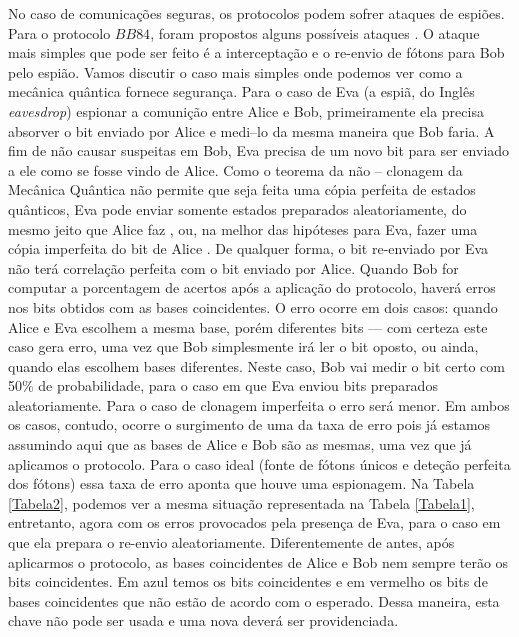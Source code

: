 \documentclass[pra, twocolumn]{revtex4}
\begin{document}
	No caso de comunica\c c\~oes seguras, os protocolos podem sofrer ataques de espi\~oes. Para o protocolo $BB84$, foram propostos alguns poss\'iveis ataques \cite{attacks}. O ataque mais simples que pode ser feito
	\'e a intercepta\c c\~ao e o re-envio de f\'otons para Bob pelo espi\~ao. Vamos discutir o caso mais simples onde podemos ver como a mec\^anica qu\^antica fornece seguran\c ca. Para o caso de Eva (a espi\~a, do Ingl\^es \textit{eavesdrop}) espionar a comuni\c c\~ao entre Alice e Bob, primeiramente ela precisa absorver o bit enviado por Alice e medi--lo da mesma maneira que Bob faria. A fim de n\~ao causar suspeitas em Bob, Eva precisa de um novo bit para ser enviado a ele como se fosse vindo de Alice. Como o teorema da n\~ao -- clonagem da Mec\^anica Qu\^antica \cite{nilsen} n\~ao permite que seja feita uma c\'opia perfeita de estados qu\^anticos, Eva pode enviar somente estados preparados aleatoriamente, do mesmo jeito que Alice faz , ou, na melhor das hip\'oteses para Eva, fazer uma c\'opia imperfeita do bit de Alice \cite{impcloning}. De qualquer forma, o bit re-enviado por Eva n\~ao ter\'a correla\c c\~ao perfeita com o bit enviado por Alice. Quando Bob for computar a porcentagem de acertos ap\'os a aplica\c c\~ao do protocolo, haver\'a erros nos bits obtidos com as bases coincidentes. O erro ocorre em dois casos: quando Alice e Eva escolhem a mesma base, por\'em diferentes bits --- com certeza este caso gera erro, uma vez que Bob simplesmente ir\'a ler o bit oposto, ou ainda, quando elas escolhem bases diferentes. Neste caso, Bob vai medir o bit certo com 50\% de probabilidade, para o caso em que Eva enviou bits preparados aleatoriamente. Para o caso de clonagem imperfeita o erro ser\'a menor. Em ambos os casos, contudo, ocorre o surgimento de uma da taxa de erro pois j\'a estamos assumindo aqui que as bases de Alice e Bob s\~ao as mesmas, uma vez que j\'a aplicamos o protocolo. Para o caso ideal (fonte de f\'otons \'unicos e dete\c c\~ao perfeita dos f\'otons) essa taxa de erro aponta que houve uma espionagem. Na Tabela \ref{Tabela2}, podemos ver a mesma situa\c c\~ao representada na Tabela \ref{Tabela1}, entretanto, agora com os erros provocados pela presen\c ca de Eva, para o caso em que ela prepara o re-envio aleatoriamente. Diferentemente de antes, ap\'os aplicarmos o protocolo, as bases coincidentes de Alice e Bob nem sempre ter\~ao os bits coincidentes. Em azul temos os bits coincidentes e em vermelho os bits de bases coincidentes que n\~ao est\~ao de acordo com o esperado. Dessa maneira, esta chave n\~ao pode ser usada e uma nova dever\'a ser providenciada.
		
\end{document}
